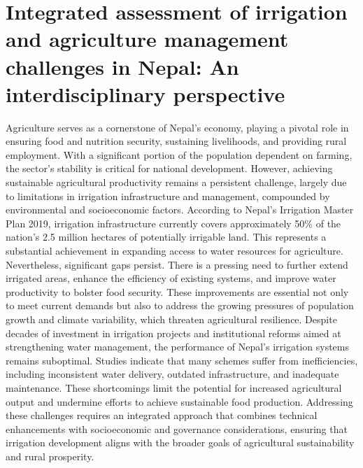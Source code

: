 \documentclass[a4paper,12pt]{article}
\begin{document}
\section{Integrated assessment of irrigation and agriculture management challenges in Nepal: An interdisciplinary perspective}
\parencite{nepalIntegratedAssessmentIrrigation2024}
Agriculture serves as a cornerstone of Nepal’s economy, playing a pivotal role in ensuring food and nutrition security, sustaining livelihoods, and providing rural employment. With a significant portion of the population dependent on farming, the sector’s stability is critical for national development. However, achieving sustainable agricultural productivity remains a persistent challenge, largely due to limitations in irrigation infrastructure and management, compounded by environmental and socioeconomic factors.
According to Nepal’s Irrigation Master Plan 2019, irrigation infrastructure currently covers approximately 50\% of the nation’s 2.5 million hectares of potentially irrigable land. This represents a substantial achievement in expanding access to water resources for agriculture. Nevertheless, significant gaps persist. There is a pressing need to further extend irrigated areas, enhance the efficiency of existing systems, and improve water productivity to bolster food security. These improvements are essential not only to meet current demands but also to address the growing pressures of population growth and climate variability, which threaten agricultural resilience.
Despite decades of investment in irrigation projects and institutional reforms aimed at strengthening water management, the performance of Nepal’s irrigation systems remains suboptimal. Studies indicate that many schemes suffer from inefficiencies, including inconsistent water delivery, outdated infrastructure, and inadequate maintenance. These shortcomings limit the potential for increased agricultural output and undermine efforts to achieve sustainable food production. Addressing these challenges requires an integrated approach that combines technical enhancements with socioeconomic and governance considerations, ensuring that irrigation development aligns with the broader goals of agricultural sustainability and rural prosperity.


























































\printbibliography
\end{document}
